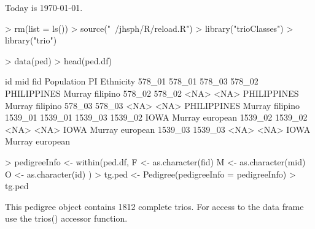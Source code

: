 \documentclass[10pt]{article}
\begin{document}
\setlength{\parskip}{0.2\baselineskip}
\setlength{\parindent}{0pt}
Today is \today.
\begin{Schunk}
\begin{Sinput}
> rm(list = ls())
> source("~/jhsph/R/reload.R")
> library("trioClasses")
> library("trio")
\end{Sinput}
\end{Schunk}
\begin{Schunk}
\begin{Sinput}
> data(ped)
> head(ped.df)
\end{Sinput}
\begin{Soutput}
             id     mid     fid  Population     PI Ethnicity
578_01   578_01  578_03  578_02 PHILIPPINES Murray  filipino
578_02   578_02    <NA>    <NA> PHILIPPINES Murray  filipino
578_03   578_03    <NA>    <NA> PHILIPPINES Murray  filipino
1539_01 1539_01 1539_03 1539_02        IOWA Murray  european
1539_02 1539_02    <NA>    <NA>        IOWA Murray  european
1539_03 1539_03    <NA>    <NA>        IOWA Murray  european
\end{Soutput}
\begin{Sinput}
> pedigreeInfo <- within(ped.df, {
     F <- as.character(fid)
     M <- as.character(mid)
     O <- as.character(id)
 })
> tg.ped <- Pedigree(pedigreeInfo = pedigreeInfo)
> tg.ped
\end{Sinput}
\begin{Soutput}
This pedigree object contains 1812 complete trios.
For access to the data frame use the trios() accessor function.
\end{Soutput}
\end{Schunk}
\end{document}
